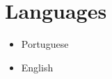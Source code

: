 \documentclass[a4paper,twoside]{simplecv}
\begin{document}
\section{Languages}

\begin{multicols}{4}
	\raggedcolumns
	\begin{itemize}
		\item Portuguese
		\item English
	\end{itemize}
\end{multicols}

%
\end{document}
